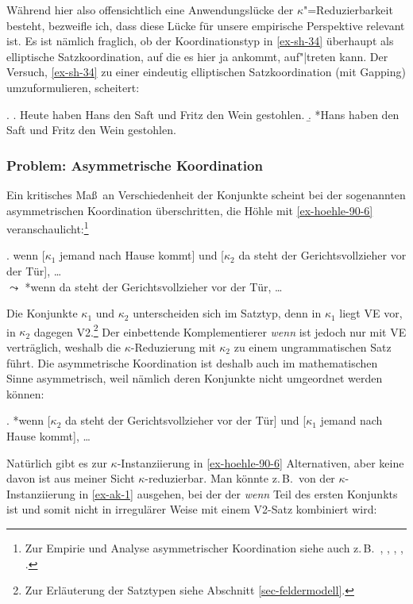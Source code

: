 Während hier also offensichtlich eine Anwendungslücke der $\kappa$"=Reduzierbarkeit besteht, bezweifle ich, dass diese Lücke für unsere empirische Perspektive relevant ist. Es ist nämlich fraglich, ob der Koordinationstyp in \ref{ex-sh-34} überhaupt als elliptische Satzkoordination, auf die es hier ja ankommt, auf"|treten kann. Der Versuch, \ref{ex-sh-34} zu einer eindeutig elliptischen Satzkoordination (mit Gapping) umzuformulieren, scheitert:

\ex. 
\a. Heute haben Hans den Saft und Fritz den Wein gestohlen.
\b. *Hans haben den Saft und Fritz den Wein gestohlen. 



\subsubsection*{Problem: Asymmetrische Koordination} \label{sec:asymmetrische:koordination}
 
Ein kritisches Ma\ss\ an Verschiedenheit der Konjunkte scheint bei der sogenannten asymmetrischen Koordination \citep{Hoehle:90} überschritten, die Höhle mit \ref{ex-hoehle-90-6} veranschaulicht:\footnote{Zur Empirie und Analyse asymmetrischer Koordination siehe auch z.\,B.\  \cite{Wunderlich:88}, \cite{Buering:Hartmann:98}, \cite{Kathol:99}, \citet[596ff]{Sternefeld:06}, \cite{Reich:09}.} 

\ex. \label{ex-hoehle-90-6} wenn [$\kappa_1$ jemand nach Hause kommt] und [$\kappa_2$ da steht der Gerichtsvollzieher vor der Tür], \ldots \\
$\leadsto$ *wenn da steht der Gerichtsvollzieher vor der Tür, \ldots \\
\citep[(6)]{Hoehle:90}

Die Konjunkte $\kappa_1$ und $\kappa_2$ unterscheiden sich im Satztyp, denn in $\kappa_1$ liegt VE vor, in $\kappa_2$ dagegen V2.\footnote{Zur Erläuterung der Satztypen siehe Abschnitt \ref{sec-feldermodell}.} Der einbettende Komplementierer {\it wenn} ist jedoch nur mit VE verträglich, weshalb die $\kappa$-Reduzierung mit $\kappa_2$ zu einem ungrammatischen Satz führt. Die asymmetrische Koordination ist deshalb auch im mathematischen Sinne asymmetrisch, weil nämlich deren Konjunkte nicht umgeordnet werden können:

\ex. *wenn [$\kappa_2$ da steht der Gerichtsvollzieher vor der Tür] und [$\kappa_1$ jemand nach Hause kommt], \ldots

Natürlich gibt es zur $\kappa$-Instanziierung in \ref{ex-hoehle-90-6} Alternativen, aber keine davon ist aus meiner Sicht $\kappa$-reduzierbar. Man könnte z.\,B.\  von der $\kappa$-Instanziierung in \ref{ex-ak-1} ausgehen, bei der der  {\it wenn} Teil des ersten Konjunkts ist und somit nicht in irregulärer Weise mit einem V2-Satz kombiniert wird:

